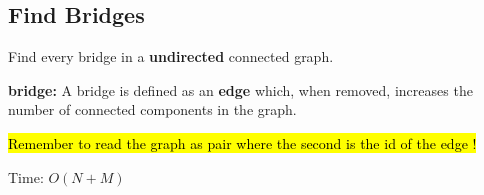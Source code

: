 \subsection{Find Bridges}

Find every bridge in a \textbf{undirected} connected graph.

\textbf{bridge: }  A bridge is defined as an \textbf{edge} which, when removed, increases the number of connected components in the graph. 

\hl{ Remember to read the graph as pair where the second is the id of the edge !}

Time: $O(N+M)$
